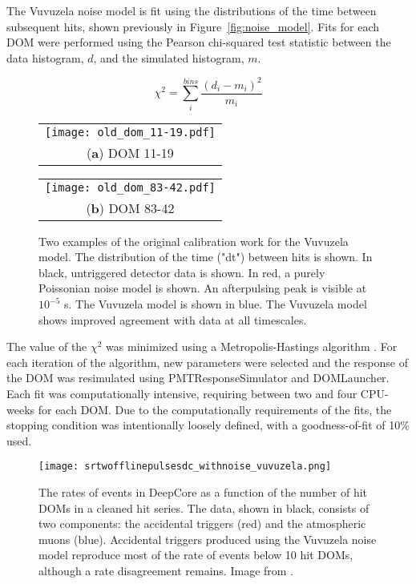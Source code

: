 The Vuvuzela noise model is fit using the distributions of the time between subsequent hits, shown previously in Figure~\ref{fig:noise_model}.
Fits for each DOM were performed using the Pearson chi-squared test statistic between the data histogram, $d$, and the simulated histogram, $m$.

\begin{equation}
\chi^2 = \sum_i^{bins} \frac{\left(d_i-m_i\right)^2}{m_i}
\end{equation}

\begin{figure}[h]
\centering
\begin{tabular}[b]{c}
  \texttt{[image: old\_dom\_11-19.pdf]} \\
  \small (\textbf{\color{ctcolormain}a}) DOM 11-19
\end{tabular} \hspace{2pt}
\begin{tabular}[b]{c}
  \texttt{[image: old\_dom\_83-42.pdf]} \\
  \small (\textbf{\color{ctcolormain}b}) DOM 83-42
\end{tabular}
\caption{Two examples of the original calibration work for the Vuvuzela model. The distribution of the time ("dt") between hits is shown. In black, untriggered detector data is shown. In red, a purely Poissonian noise model is shown. An afterpulsing peak is visible at $10^{-5}$ s. The Vuvuzela model is shown in blue. The Vuvuzela model shows improved agreement with data at all timescales.}
\label{fig:old_vuvuzela_fits}
\end{figure}


The value of the $\chi^2$ was minimized using a Metropolis-Hastings algorithm \cite{PDG-2015}.
For each iteration of the algorithm, new parameters were selected and the response of the DOM was resimulated using PMTResponseSimulator and DOMLauncher.
Each fit was computationally intensive, requiring between two and four CPU-weeks for each DOM.
Due to the computationally requirements of the fits, the stopping condition was intentionally loosely defined, with a goodness-of-fit of 10\% used.

\begin{figure}
\centering
\texttt{[image: srtwofflinepulsesdc\_withnoise\_vuvuzela.png]} 
\caption{The rates of events in DeepCore as a function of the number of hit DOMs in a cleaned hit series. The data, shown in black, consists of two components: the accidental triggers (red) and the atmospheric muons (blue). Accidental triggers produced using the Vuvuzela noise model reproduce most of the rate of events below 10 hit DOMs, although a rate disagreement remains. Image from \cite{Thesis-Vuvuzela}.}
\label{fig:old_nch}
\end{figure}

